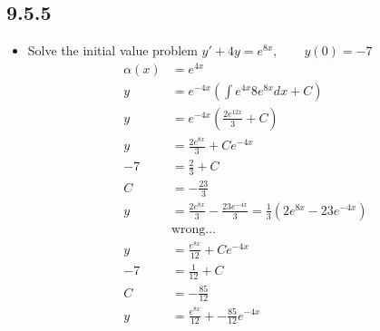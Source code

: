 \begin{itemize}
  \subsection{9.5.5}
  \begin{itemize}
    \item Solve the initial value problem \(y' + 4y = e^{8x}, \qquad y(0) = -7
      \)
      \begin{align*}
        \alpha (x) &= e^{4x} \\
        y &= e^{-4x} \left( \int e^{4x} 8e^{8x} dx + C \right) \\
        y &= e^{-4x} \left(  \frac{2e^{12x}}{3} + C \right) \\
        y &= \frac{2e^{8x}}{3} + Ce^{-4x} \\
        -7 &= \frac{2}{3} + C \\
        C &= -\frac{23}{3} \\
        y &= \frac{2e^{8x}}{3} - \frac{23e^{-4x}}{3} = \frac{1}{3}(2e^{8x}-23e^{-4x}) \\
          &\text{wrong\ldots} \\
        y &= \frac{e^{8x}}{12} + Ce^{-4x} \\
        -7 &= \frac{1}{12} + C \\
        C &= -\frac{85}{12} \\
        y &= \frac{e^{8x}}{12} + -\frac{85}{12}e^{-4x} \\
      \end{align*}
  \end{itemize}




\end{itemize}
